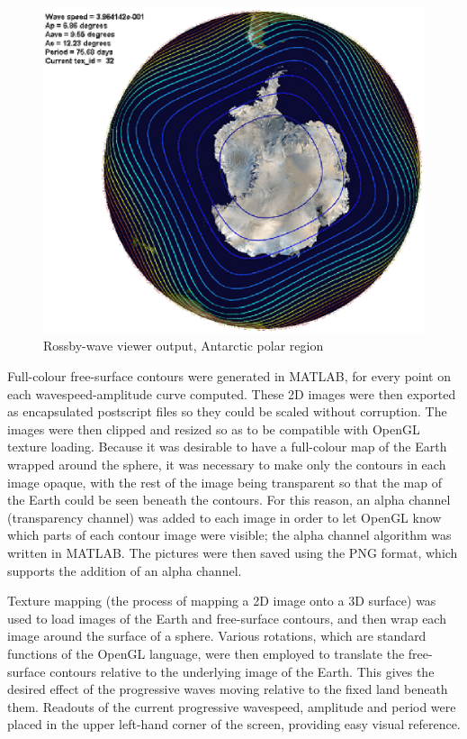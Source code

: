\begin{figure}[htbp]
	\centering
		\includegraphics[scale=0.80]{viewer/view2.eps}
	\caption{Rossby-wave viewer output, Antarctic polar region}
	\label{fig:view2}
\end{figure} 

Full-colour free-surface contours were generated in MATLAB, for every point on each wavespeed-amplitude curve computed. These 2D images were then exported as encapsulated postscript files so they could be scaled without corruption. The images were then clipped and resized so as to be compatible with OpenGL texture loading. Because it was desirable to have a full-colour map of the Earth wrapped around the sphere, it was necessary to make only the contours in each image opaque, with the rest of the image being transparent so that the map of the Earth could be seen beneath the contours. For this reason, an alpha channel (transparency channel) was added to each image in order to let OpenGL know which parts of each contour image were visible; the alpha channel algorithm was written in MATLAB. The pictures were then saved using the PNG format, which supports the addition of an alpha channel.

Texture mapping (the process of mapping a 2D image onto a 3D surface) was used to load images of the Earth and free-surface contours, and then wrap each image around the surface of a sphere. Various rotations, which are standard functions of the OpenGL language, were then employed to translate the free-surface contours relative to the underlying image of the Earth. This gives the desired effect of the progressive waves moving relative to the fixed land beneath them. Readouts of the current progressive wavespeed, amplitude and period were placed in the upper left-hand corner of the screen, providing easy visual reference. 

